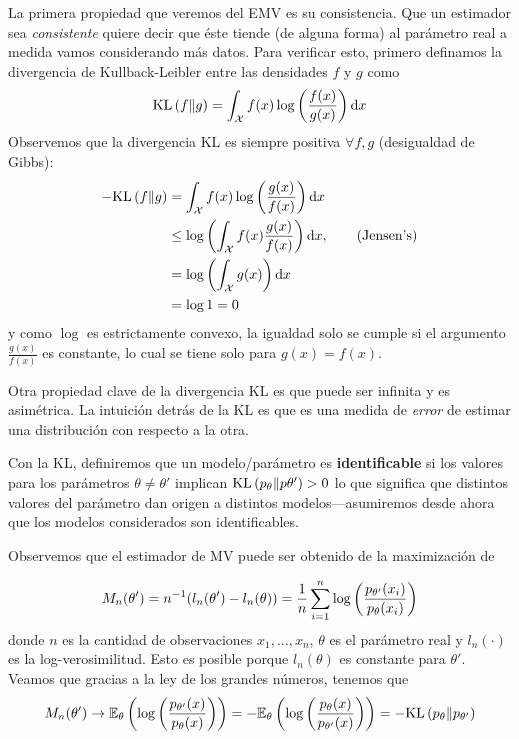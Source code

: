 La primera propiedad que veremos del EMV es su consistencia. Que un estimador sea \textit{consistente} quiere decir que éste tiende (de alguna forma) al parámetro real a medida vamos considerando más datos. Para verificar esto, primero definamos la divergencia de Kullback-Leibler entre las densidades $f$ y $g$ como 
\begin{equation}
	\text{KL}\left(f\middle\|g\right) = \int_{\mathcal X} f(x)\log\left(\frac{f(x)}{g(x)}\right){\text{d}x}
\end{equation}
Observemos que la divergencia KL es siempre positiva $\forall f,g$ (desigualdad de Gibbs):
\begin{align*}
 	-\text{KL}\left(f\middle\|g\right)  &= \int_{\mathcal X} f(x)\log\left(\frac{g(x)}{f(x)}\right){\text{d}x}\\
 				&\leq \log\left(\int_{\mathcal X} f(x)\frac{g(x)}{f(x)}\right){\text{d}x}, \quad\quad \text{(Jensen's)}\\
 				&= \log\left(\int_{\mathcal X} g(x)\right){\text{d}x}\\
 				&=\log 1=0	
 \end{align*} 
 y como $\log$ es estrictamente convexo, la igualdad solo se cumple si el argumento $\frac{g(x)}{f(x)}$ es constante, lo cual se tiene solo para ${g(x)} = {f(x)}$.

 Otra propiedad clave de la divergencia KL es que puede ser infinita y es asimétrica. La intuición detrás de la KL es que es una medida de \textit{error} de estimar una distribución con respecto a la otra. 

 Con la KL, definiremos que un modelo/parámetro es \textbf{identificable} si los valores para los parámetros $\theta\neq\theta'$ implican $\text{KL}\left(p_\theta\middle\|p\theta'\right)>0$ lo que significa que distintos valores del parámetro dan origen a distintos modelos---asumiremos desde ahora que los modelos considerados son identificables.

Observemos que el estimador de MV puede ser obtenido de la maximización de

\begin{equation}
 	M_n (\theta') = n^{-1} (l_n(\theta') - l_n(\theta))  = \frac{1}{n} \sum_{i=1}^n \log\left(\frac{p_{\theta'}(x_i)}{p_{\theta}(x_i)}\right)
 \end{equation} 
 donde $n$ es la cantidad de observaciones $x_1,\ldots,x_n$, $\theta$ es el parámetro real y $l_n(\cdot)$ es la log-verosimilitud. Esto es posible porque $l_n(\theta)$ es constante para $\theta'$. Veamos que gracias a la ley de los grandes números, tenemos que 
 \begin{equation}
 	M_n(\theta') \rightarrow \mathbb{E}_\theta \left(\log\left(\frac{p_{\theta'}(x)}{p_{\theta}(x)}\right)\right) = -\mathbb{E}_\theta \left(\log\left(\frac{p_{\theta}(x)}{p_{\theta'}(x)}\right)\right) = -\text{KL}\left(p_\theta\middle\|p_{\theta'}\right)
 \end{equation}

